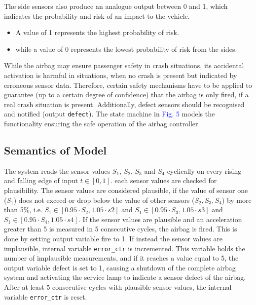 \documentclass[12pt	]{article}
\begin{document}
The side sensors also produce an analogue output between 0 and 1, which indicates the probability and risk of an impact to the vehicle.

\begin{itemize}
	\item A value of 1 represents the highest probability of risk.
	\item while a value of 0 represents the lowest probability of risk from the sides.
\end{itemize}


While the airbag may ensure passenger safety in crash situations, its accidental activation is harmful in situations, when no crash is present but indicated by erroneous sensor data. Therefore, certain safety mechanisms have to be applied to guarantee (up to a certain degree of confidence) that the airbag is only fired, if a real crash situation is present. Additionally, defect sensors should be recognised and notified (output \texttt{defect}). The state machine in \textcolor{blue}{Fig. 5} models the functionality ensuring the safe operation of the airbag controller.


\subsection{Semantics of Model}
The system reads the sensor values $S_1$, $S_2$, $S_3$ and $S_4$ cyclically on every rising and falling edge of input $t \in [0, 1]$. each sensor values are checked for plausibility. The sensor values are considered plausible, if the value of sensor one ($S_1$) does not exceed or drop below the value of other sensors ($S_2, S_3, S_4$) by more than 5\%, i.e. $S_1 \in [0.95 \cdot S_2, 1.05 \cdot s2]$ and $S_1 \in [0.95 \cdot S_3, 1.05 \cdot s3]$ and $S_1 \in [0.95 \cdot S_4, 1.05 \cdot s4]$. If the sensor values
are plausible and an acceleration greater than 5 is measured in 5 consecutive cycles, the airbag is fired. This is done by setting output variable fire to 1. If instead the sensor values are implausible, internal variable \texttt{error\_ctr} is incremented. This variable holds the number of implausible measurements, and if it reaches a value equal to 5, the output variable defect is set to 1, causing a shutdown of the complete airbag system and activating the service lamp to indicate a sensor defect of the airbag. After at least 5 consecutive cycles with plausible sensor values, the internal variable \texttt{error\_ctr} is reset.
\end{document}
